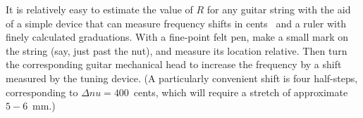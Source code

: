 It is relatively easy to estimate the value of $R$ for any guitar string with the aid of a simple device that can measure frequency shifts in cents~\cite{ref:pgtweb} and a ruler with finely calculated graduations. With a fine-point felt pen, make a small mark on the string (say, just past the nut), and measure its location relative. Then turn the corresponding guitar mechanical head to increase the frequency by a shift measured by the tuning device. (A particularly convenient shift is four half-steps, corresponding to $\Delta nu = 400$~cents, which will require a stretch of approximate $5 - 6$~mm.) 

%
%
%

